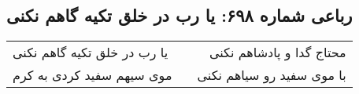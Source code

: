 \begin{center}
\section*{رباعی شماره ۶۹۸: یا رب در خلق تکیه گاهم نکنی}
\label{sec:sh698}
\begin{longtable}{l p{0.5cm} r}
یا رب در خلق تکیه گاهم نکنی
&&
محتاج گدا و پادشاهم نکنی
\\
موی سیهم سفید کردی به کرم
&&
با موی سفید رو سیاهم نکنی
\\
\end{longtable}
\end{center}
